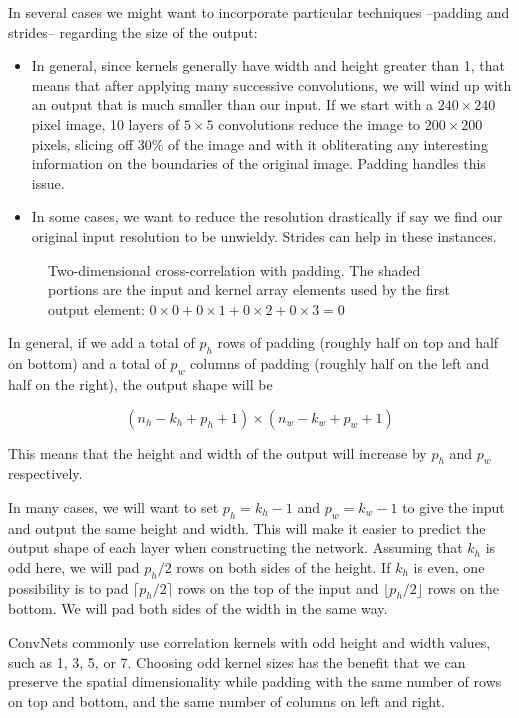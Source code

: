 In several cases we might want to incorporate particular techniques --padding and strides-- regarding the size of the output:
\begin{itemize}
    \item In general, since kernels generally have width and height greater than 1, that means that after applying many successive convolutions, we will wind up with an output that is much smaller than our input. If we start with a $240\times240$ pixel image, 10 layers of $5\times5$ convolutions reduce the image to $200\times200$ pixels, slicing off 30\% of the image and with it obliterating any interesting information on the boundaries of the original image. Padding handles this issue.
    \item In some cases, we want to reduce the resolution drastically if say we find our original input resolution to be unwieldy. Strides can help in these instances.
\end{itemize}

\begin{figure}[hpt]
	\centering
	
	\caption{Two-dimensional cross-correlation with padding. The shaded portions are the input and kernel array elements used by the first output element: $0\times0+0\times1+0\times2+0\times3=0$}
	\label{fig:conv_pad}
\end{figure}

In general, if we add a total of  $p_h$  rows of padding (roughly half on top and half on bottom) and a total of  $p_w$  columns of padding (roughly half on the left and half on the right), the output shape will be

$$(n_h-k_h+p_h+1)\times(n_w-k_w+p_w+1)$$
 
This means that the height and width of the output will increase by  $p_h$  and  $p_w$  respectively.

In many cases, we will want to set  $p_h=k_h-1$  and  $p_w=k_w-1$  to give the input and output the same height and width. This will make it easier to predict the output shape of each layer when constructing the network. Assuming that  $k_h$  is odd here, we will pad  $p_h/2$ rows on both sides of the height. If $k_h$  is even, one possibility is to pad  $\lceil p_h/2\rceil$  rows on the top of the input and  $\lfloor p_h/2\rfloor$  rows on the bottom. We will pad both sides of the width in the same way.

ConvNets commonly use correlation kernels with odd height and width values, such as 1, 3, 5, or 7. Choosing odd kernel sizes has the benefit that we can preserve the spatial dimensionality while padding with the same number of rows on top and bottom, and the same number of columns on left and right.

